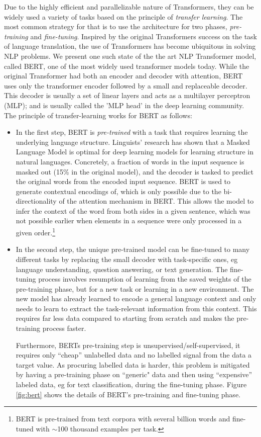 Due to the highly efficient and parallelizable nature of Transformers, they can be widely used a variety of tasks based on the principle of \emph{transfer learning}. The most common strategy for that is to use the architecture for two phases, \emph{pre-training} and \emph{fine-tuning}. Inspired by the original Transformers success on the task of language translation, the use of Transformers has become ubiquitous in solving NLP problems. We present one such state of the the art NLP Transformer model, 
called BERT\cite{devlinBERTPretrainingDeep2019}, one of the most widely used transformer models today.
While the original Transformer had both an encoder and decoder with attention, BERT uses only the transformer encoder followed by a small and replaceable decoder. This decoder is usually a set of linear layers and acts as a multilayer perceptron (MLP); and is usually called the 'MLP head' in the deep learning community. The principle of transfer-learning works for BERT as follows:

\begin{itemize}
\item In the first step, BERT is \emph{pre-trained} with a task that requires learning the underlying language structure. Linguists' research has shown that a Masked Language Model is optimal for deep learning models for learning structure in natural languages\cite{wettigShouldYouMask}.
Concretely, a fraction of words in the input sequence is masked out (15\% in the original model), and the decoder is tasked to predict the original words from the encoded input sequence.
BERT is used to generate contextual encodings of, which is only possible due to the bi-directionality of the attention mechanism in BERT. This allows the model to infer the context of the word from both sides in a given sentence, which was not possible earlier when elements in a sequence were only processed in a given order.\footnote{
    BERT is pre-trained from text corpora with several billion words and fine-tuned with $\sim$100 thousand examples per task.
}

\item In the second step, the unique pre-trained model can be fine-tuned to many different tasks by replacing the small decoder with task-specific ones, eg language understanding, question answering, or text generation.
The fine-tuning process involves resumption of learning from the saved weights of the pre-training phase, but for a new task or learning in a new environment. The new model has already learned to encode a general language context and only needs to learn to extract the task-relevant information from this context. This requires far less data compared to starting from scratch and makes the pre-training process faster.

Furthermore, BERTs pre-training step is unsupervised/self-supervised, \ie it requires only ``cheap'' unlabelled data and no labelled signal from the data a target value. As procuring labelled data is harder, this problem is mitigated by having a pre-training phase on ``generic" data and then using 
``expensive'' labeled data, eg for text classification, during the fine-tuning phase. Figure \ref{fig:bert} shows the details of BERT's pre-training and fine-tuning phase.
\end{itemize}

